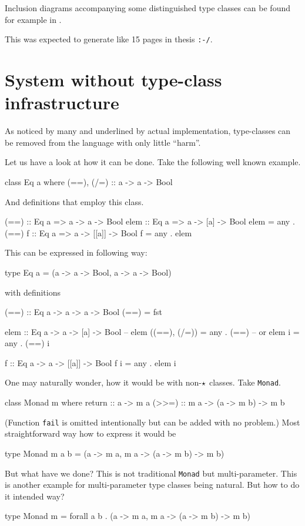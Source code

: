 \documentclass[11pt,oneside,draft]{fithesis2}
\newcommand\uv[1]{``#1''}
\theoremstyle{definition}
\begin{document}
Inclusion diagrams accompanying some distinguished type classes can be found for
example in \cite{typeclassopedia}.

This was expected to generate like 15 pages in thesis \verb~:-/~.

\section{System without type-class infrastructure}

As noticed by many and underlined by actual implementation, type-classes can be removed
from the language with only little \uv{harm}.

Let us have a look at how it can be done. Take the following well known example.
\begin{code}
class Eq a where
    (==), (/=) :: a -> a -> Bool
\end{code}
And definitions that employ this class.
\begin{code}
(==) :: Eq a => a -> a -> Bool
elem :: Eq a => a -> [a] -> Bool
elem = any . (==)
f :: Eq a => a -> [[a]] -> Bool
f = any . elem
\end{code}
This can be expressed in following way:
\begin{code}
type Eq a = (a -> a -> Bool, a -> a -> Bool)
\end{code}
with definitions
\begin{code}
(==) :: Eq a -> a -> a -> Bool
(==) = fst

elem :: Eq a -> a -> [a] -> Bool
-- elem ((==), (/=)) = any . (==)
-- or
elem i = any . (==) i

f :: Eq a -> a -> [[a]] -> Bool
f i = any . elem i
\end{code}

One may naturally wonder, how it would be with non-\(\star\) classes.
Take \texttt{Monad}.
\begin{code}
class Monad m where
	return :: a -> m a
	(>>=) :: m a -> (a -> m b) -> m b
\end{code}
(Function \texttt{fail} is omitted intentionally but can be added with
no problem.)
Most straightforward way how to express it would be
\begin{code}
type Monad m a b = (a -> m a, m a -> (a -> m b) -> m b)
\end{code}
But what have we done? This is not traditional \texttt{Monad} but
multi-parameter. This is another example for multi-parameter type classes
being natural. But how to do it intended way?
\begin{code}
type Monad m = forall a b . (a -> m a, m a -> (a -> m b) -> m b)
\end{code}
\end{document}
